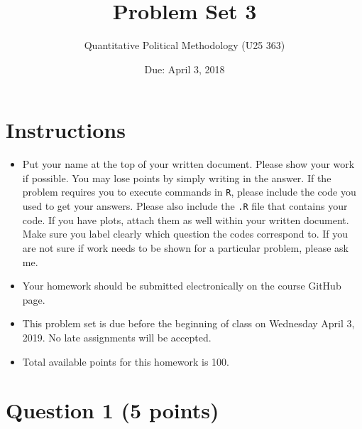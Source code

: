 \documentclass[12pt,letterpaper]{article}
\title{Problem Set 3}
\date{Due: April 3, 2018}
\author{Quantitative Political Methodology (U25 363)}
\begin{document}
	\maketitle
	
	
	\section*{Instructions}
	\begin{itemize}
			\item Put your name at the top of your written document. Please show your work if possible. You may lose points by simply writing in the answer. If the problem requires you to execute commands in \texttt{R}, please include the code you used to get your answers. Please also include the \texttt{.R} file that contains your code. If you have plots, attach them as well within your written document. Make sure you label clearly which question the codes correspond to. If you are not sure if work needs to be shown for a particular problem, please ask me.
		\item Your homework should be submitted electronically on the course GitHub page.
		\item This problem set is due before the beginning of class on Wednesday April 3, 2019. No late assignments will be accepted.
		\item Total available points for this homework is 100.
	\end{itemize}
	
	\section*{Question 1 (5 points)}
	
\end{document}
